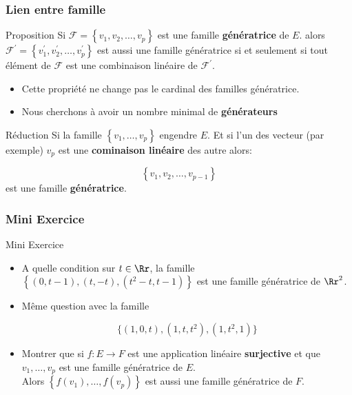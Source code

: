 \documentclass[dvipsnames]{beamer}
\begin{document}
\begin{frame}[t]
  \frametitle{Lien entre famille}
  
  \begin{block}{Proposition }
    \small
    Si $\mathcal{F}=\left\{v_1,v_2,\ldots, v_p\right\}$ est une famille
    \textbf{génératrice} de $E$. alors $\mathcal{F}^{'}=\left\{v_1^{'},
    v_2^{'},\ldots, v_p^{'}\right\}$ est aussi une famille génératrice si et
    seulement si tout élément de $\mathcal{F}$ est une combinaison linéaire de
    $\mathcal{F^{'}}$.
  \end{block}

  \begin{itemize}
    \small
    \item Cette propriété ne change pas le cardinal des familles génératrice. 
    \item Nous cherchons à avoir un nombre minimal de \textbf{générateurs} 
  \end{itemize}
  \pause
  \begin{block}{Réduction}
    \scriptsize
    Si la famille $\left\{v_1,\ldots, v_p\right\}$ engendre $E$. Et si l'un des
    vecteur (par exemple) $v_p$  est une \textbf{cominaison linéaire}  des
    autre alors:

    \begin{equation}
      \left\{v_1,v_2,\ldots, v_{p-1}\right\}
    \end{equation}
    est une famille \textbf{\alert{génératrice}}.
  \end{block}
\end{frame}

\begin{frame}[t]
  \frametitle{Mini Exercice}
 \begin{block}{Mini Exercice}
\scriptsize
   \begin{itemize}
     \item A quelle condition sur $t\in \Rr$, la famille $\left\{ (0,t-1), (t,
       -t), (t^2-t, t-1)\right\}$ est une famille génératrice de $\Rr^2$.\\[4pt]
      \item Même question avec la famille

        \begin{equation*}
          \big\{ (1,0,t), (1,t,t^2), (1,t^2,1)\big\}
        \end{equation*}
 \item Montrer que si $f:E\longrightarrow F$ est une application linéaire
   \textbf{surjective} et que $v_1,\ldots, v_p$ est une famille génératrice de
   $E$.\\

   Alors  $\left\{f(v_1), \ldots, f(v_p)\right\}$ est aussi une famille
   génératrice de $F$.
   \end{itemize}
 \end{block} 
\end{frame}
\end{document}
